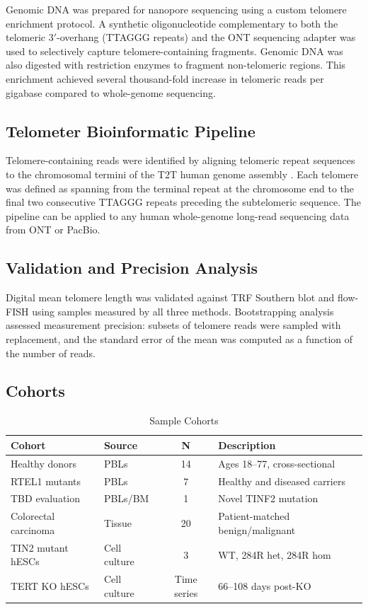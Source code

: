 \documentclass[11pt]{article}
\begin{document}
Genomic DNA was prepared for nanopore sequencing using a custom telomere enrichment protocol. A synthetic oligonucleotide complementary to both the telomeric 3$'$-overhang (TTAGGG repeats) and the ONT sequencing adapter was used to selectively capture telomere-containing fragments. Genomic DNA was also digested with restriction enzymes to fragment non-telomeric regions. This enrichment achieved several thousand-fold increase in telomeric reads per gigabase compared to whole-genome sequencing.

\subsection{Telometer Bioinformatic Pipeline}

Telomere-containing reads were identified by aligning telomeric repeat sequences to the chromosomal termini of the T2T human genome assembly \citep{nurk2022complete}. Each telomere was defined as spanning from the terminal repeat at the chromosome end to the final two consecutive TTAGGG repeats preceding the subtelomeric sequence. The pipeline can be applied to any human whole-genome long-read sequencing data from ONT or PacBio.

\subsection{Validation and Precision Analysis}

Digital mean telomere length was validated against TRF Southern blot and flow-FISH using samples measured by all three methods. Bootstrapping analysis assessed measurement precision: subsets of telomere reads were sampled with replacement, and the standard error of the mean was computed as a function of the number of reads.

\subsection{Cohorts}

\begin{table}[ht]
\centering
\caption{Sample Cohorts}
\label{tab:cohorts}
\begin{tabular}{llcl}
\toprule
\textbf{Cohort} & \textbf{Source} & \textbf{N} & \textbf{Description} \\
\midrule
Healthy donors & PBLs & 14 & Ages 18--77, cross-sectional \\
RTEL1 mutants & PBLs & 7 & Healthy and diseased carriers \\
TBD evaluation & PBLs/BM & 1 & Novel TINF2 mutation \\
Colorectal carcinoma & Tissue & 20 & Patient-matched benign/malignant \\
TIN2 mutant hESCs & Cell culture & 3 & WT, 284R het, 284R hom \\
TERT KO hESCs & Cell culture & Time series & 66--108 days post-KO \\
\bottomrule
\end{tabular}
\end{table}
\end{document}
